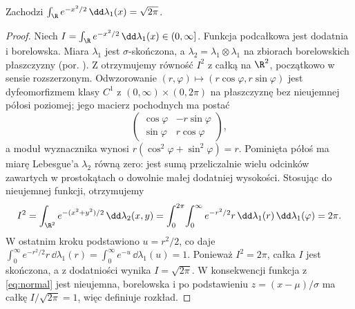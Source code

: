 \begin{lemat}
Zachodzi $\int_\R e^{-x^2/2}\,\dd\lambda_1(x)=\sqrt{2\pi}$.
\end{lemat}
\begin{proof}
Niech $I=\int_\R e^{-x^2/2}\,\dd\lambda_1(x)\in(0,\infty]$.
Funkcja podcałkowa jest dodatnia i borelowska.
Miara $\lambda_1$ jest $\sigma$-skończona, a
$\lambda_2=\lambda_1\otimes\lambda_1$
na zbiorach borelowskich płaszczyzny
(por. ).
Z 
otrzymujemy równość $I^2$ z całką na $\R^2$, początkowo
w sensie rozszerzonym. Odwzorowanie
$(r,\varphi)\mapsto(r\cos\varphi,r\sin\varphi)$ jest
dyfeomorfizmem klasy $C^1$ z $(0,\infty)\times(0,2\pi)$
na płaszczyznę bez nieujemnej półosi poziomej;
jego macierz pochodnych ma postać
\[
\begin{pmatrix}
\cos\varphi&-r\sin\varphi\\
\sin\varphi&r\cos\varphi
\end{pmatrix},
\]
a moduł wyznacznika wynosi $r(\cos^2\varphi+\sin^2\varphi)=r$.
Pominięta półoś ma miarę Lebesgue'a $\lambda_2$ równą zero:
jest sumą przeliczalnie wielu odcinków zawartych
w prostokątach o dowolnie małej dodatniej wysokości.
Stosując 
do nieujemnej funkcji, otrzymujemy
\[
I^2=\int_{\R^2}e^{-(x^2+y^2)/2}\,\dd\lambda_2(x,y)
=\int_0^{2\pi}\!\int_0^\infty e^{-r^2/2}r\,
\dd\lambda_1(r)\,\dd\lambda_1(\varphi)=2\pi.
\]
W ostatnim kroku podstawiono $u=r^2/2$, co daje
$\int_0^\infty e^{-r^2/2}r\,\dd\lambda_1(r)
=\int_0^\infty e^{-u}\,\dd\lambda_1(u)=1$.
Ponieważ $I^2=2\pi$, całka $I$ jest skończona,
a z dodatniości wynika $I=\sqrt{2\pi}$.
W konsekwencji funkcja z \eqref{eq:normal} jest nieujemna,
borelowska i po podstawieniu $z=(x-\mu)/\sigma$
ma całkę $I/\sqrt{2\pi}=1$, więc definiuje rozkład.
\end{proof}

